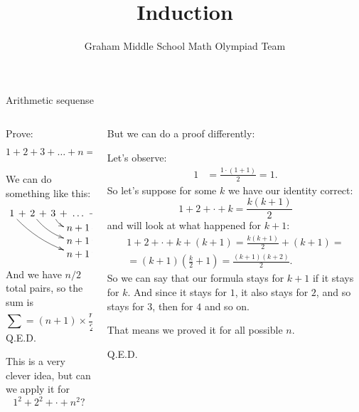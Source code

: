 \documentclass[9pt,aspectratio=169]{beamer}
\title{Induction}
\subtitle[Graham Middle School]{Graham Middle School Math Olympiad Team}
\begin{document}
\maketitle

\begin{frame}{Arithmetic sequense}
  \begin{columns}[T]
    \begin{column}{0.5\textwidth}
      \begin{problem}
        Prove:
        \[
          1 + 2 + 3 + \dots + n = \frac{n (n+1)}{2}.
        \]
      \end{problem}\pause

      We can do something like this:
      \[ \xymatrix@C=-2pt@R=0pt{
        1\ar@/_/[dddrrrrr] & + & 2\ar@/_/[ddrrr] & + & 3\ar@/_/[dr] & +\ \ldots\ + & (n-2)\ar@/^/[dl] & + & (n-1)\ar@/^/[ddlll] & + & n\ar@/^/[dddlllll] \\
        & & & & & n+1 & & & & & \\
        & & & & & n+1 & & & & & \\
        & & & & & n+1 & & & & & 
      } \]
      And we have $n/2$ total pairs, so the sum is
      \[
        \sum = (n+1) \times \frac{n}{2} = \frac{n(n+1)}{2}.
      \]
      \hfill Q.E.D.\pause

      This is a very clever idea, but can we apply it for 
      \[ 1^2 + 2^2 + \cdot + n^2? \]\pause
    \end{column}
    \begin{column}{0.5\textwidth}
      But we can do a proof differently:
      
      Let's observe:
      \begin{align*}
        1 &= \frac{1 \cdot ( 1 + 1)}{2} = 1.
      \end{align*}\pause
      So let's suppose for some $k$ we have our identity correct:
      \[ 1 + 2 + \cdot + k = \frac{k (k + 1)}{2} \]\pause
      and will look at what happened for $k+1$:
      \begin{multline*} 
        1 + 2 + \cdot + k + (k+1) = \frac{k (k+1)}{2} + (k+1) =\\
        = (k+1) \left(\frac{k}{2} + 1\right) = \frac{(k+1)(k+2)}{2}. 
      \end{multline*}\pause
      So we can say that our formula stays for $k+1$ if it stays for $k$. And since it stays for $1$, it also stays for $2$, and so stays for $3$, then for $4$ and so on. 

      That means we proved it for all possible $n$. 

      \hfill Q.E.D.
    \end{column}
  \end{columns}
\end{frame}
\end{document}
